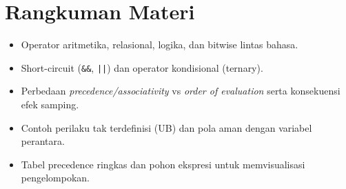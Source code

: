 \documentclass[../main.tex]{subfiles}
\begin{document}
\section{Rangkuman Materi}
\begin{itemize}
  \item Operator aritmetika, relasional, logika, dan bitwise lintas bahasa.
  \item Short-circuit (\texttt{\&\&}, \texttt{||}) dan operator kondisional (ternary).
  \item Perbedaan \emph{precedence/associativity} vs \emph{order of evaluation} serta konsekuensi efek samping.
  \item Contoh perilaku tak terdefinisi (UB) dan pola aman dengan variabel perantara.
  \item Tabel precedence ringkas dan pohon ekspresi untuk memvisualisasi pengelompokan.
\end{itemize}
\end{document}
